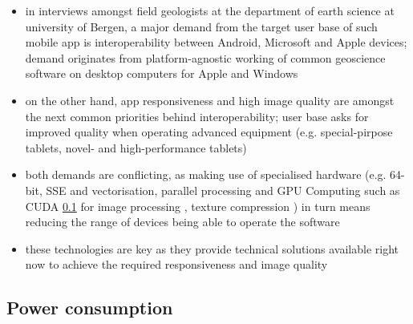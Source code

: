 \documentclass[review]{elsarticle}
\begin{document}
\begin{itemize}
\item in interviews amongst field geologists at the department of earth science at university of Bergen, a major demand from the target user base of such mobile app is interoperability between Android, Microsoft and Apple devices; demand originates from platform-agnostic working of common geoscience software on desktop computers for Apple and Windows
\item on the other hand, app responsiveness and high image quality are amongst the next common priorities behind interoperability; user base asks for improved quality when operating advanced equipment (e.g. special-pirpose tablets, novel- and high-performance tablets)
\item both demands are conflicting, as making use of specialised hardware (e.g. 64-bit, \gls{SSE} and vectorisation, parallel processing and GPU Computing such as CUDA \ref{} for image processing \cite{Heymann2007,Hudelist2014}, texture compression \cite{}) in turn means reducing the range of devices being able to operate the software
\item these technologies are key as they provide technical solutions available right now to achieve the required responsiveness and image quality
\end{itemize}

%

\subsection{Power consumption}
\end{document}
